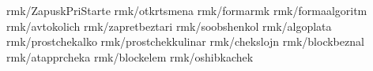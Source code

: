 \newpage
 {rmk/ZapuskPriStarte}%
 {rmk/otkrtsmena}%
 {rmk/formarmk}%
 {rmk/formaalgoritm}%
 {rmk/avtokolich}%
 {rmk/zapretbeztari}%
 {rmk/soobshenkol}%
 {rmk/algoplata}%
 {rmk/prostchekalko}%
 {rmk/prostchekkulinar}%
 {rmk/chekslojn}%
 {rmk/blockbeznal}%
 {rmk/atapprcheka}%
 {rmk/blockelem}%
 {rmk/oshibkachek}%









\newpage
\newpage
\newpage
\newpage
\newpage
\newpage
\newpage


\newpage

\newpage
\newpage

\newpage
\newpage

\newpage





\newpage


